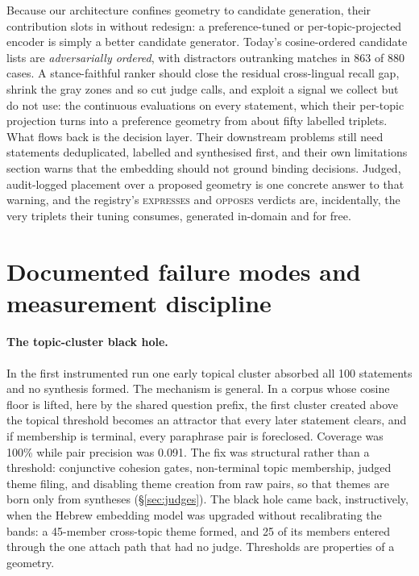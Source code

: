 \documentclass{article}
\begin{document}
Because our architecture confines geometry to candidate generation, their contribution slots in without redesign: a preference-tuned or per-topic-projected encoder is simply a better candidate generator. Today's cosine-ordered candidate lists are \emph{adversarially ordered}, with distractors outranking matches in 863 of 880 cases. A stance-faithful ranker should close the residual cross-lingual recall gap, shrink the gray zones and so cut judge calls, and exploit a signal we collect but do not use: the continuous evaluations on every statement, which their per-topic projection turns into a preference geometry from about fifty labelled triplets. What flows back is the decision layer. Their downstream problems still need statements deduplicated, labelled and synthesised first, and their own limitations section warns that the embedding should not ground binding decisions. Judged, audit-logged placement over a proposed geometry is one concrete answer to that warning, and the registry's \textsc{expresses} and \textsc{opposes} verdicts are, incidentally, the very triplets their tuning consumes, generated in-domain and for free.


\section{Documented failure modes and measurement discipline}
\label{app:failures}
\paragraph{The topic-cluster black hole.} In the first instrumented run one early topical cluster absorbed all 100 statements and no synthesis formed. The mechanism is general. In a corpus whose cosine floor is lifted, here by the shared question prefix, the first cluster created above the topical threshold becomes an attractor that every later statement clears, and if membership is terminal, every paraphrase pair is foreclosed. Coverage was 100\% while pair precision was 0.091. The fix was structural rather than a threshold: conjunctive cohesion gates, non-terminal topic membership, judged theme filing, and disabling theme creation from raw pairs, so that themes are born only from syntheses (\S\ref{sec:judges}). The black hole came back, instructively, when the Hebrew embedding model was upgraded without recalibrating the bands: a 45-member cross-topic theme formed, and 25 of its members entered through the one attach path that had no judge. Thresholds are properties of a geometry.
\end{document}

